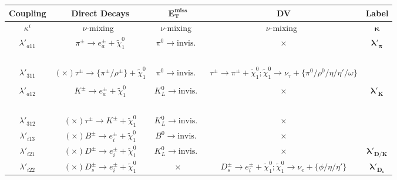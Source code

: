 \begin{table}[!ht]
\centering
\begin{adjustbox}{width=\columnwidth}
\begin{tabular}{|c|c|c|c|c|}
\hline
\bf{Coupling} & \bf{Direct Decays} & $\bm{E_T^\text{miss}}$ & \bf{DV} & \bf{Label}\\
\hline
$\kappa^i$ & $\nu$-mixing~\cite{Fernandez-Martinez:2023phj} & $\nu$-mixing~\cite{Fernandez-Martinez:2023phj} & $\nu$-mixing~\cite{Fernandez-Martinez:2023phj} & $\bm{\kappa}$\\
\hline
$\lambda'_{a11}$ & $\pi^\pm\to e^\pm_a + \tilde{\chi}^0_1$
& $\pi^0\to \text{invis.}$~\cite{NA62:2020pwi} & $\bm{\times}$ & \multirow{4}{*}{$\bm{\lambda'_{\pi}}$}\\[0.13 cm]
&~\cite{PiENu:2015seu, PIENU:2017wbj, PIENU:2019usb, PIONEER:2022alm} &&& \\[0.15 cm]
$\lambda'_{311}$ & $\left(\bm{\times}\right) \tau^\pm\to \{\pi^\pm/\rho^\pm\} + \tilde{\chi}^0_1$ & $\pi^0\to \text{invis.}$~\cite{NA62:2020pwi} & $\tau^\pm\to \pi^\pm + \tilde{\chi}^0_1; \tilde{\chi}^0_1 \to \nu_{\tau} + \{\pi^0/\rho^0/\eta/\eta'/\omega\}$
& \\[0.15 cm]
&&&\cite{Ballett:2019bgd, Kling:2018wct, DeVries:2020jbs, Beltran:2023nli}&\\
\hline
$\lambda'_{a12}$ & $K^\pm\to e^\pm_a + \tilde{\chi}^0_1$ & $K^0_L\to \text{invis.}$~\cite{Workman:2022ynf} & $\bm{\times}$ & \multirow{4}{*}{$\bm{\lambda'_{K}}$}\\[0.15 cm]
&~\cite{Asano:1981he, Hayano:1982wu, NA62:2020mcv, NA62:2021bji} &&&\\[0.15 cm]
$\lambda'_{312}$ & $\left(\bm{\times}\right) \tau^\pm\to K^\pm + \tilde{\chi}^0_1$ & $K^0_L\to \text{invis.}$~\cite{Workman:2022ynf} & $\bm{\times}$ & \\[0.15 cm]
\hline
$\lambda'_{i13}$ & $\left(\bm{\times}\right) B^\pm\to e^\pm_i + \tilde{\chi}^0_1$ & $B^0\to \text{invis.}$~\cite{BaBar:2012yut} & $\bm{\times}$ & $\bm{\lambda'_{B1}}$\\[0.15 cm]
\hline
$\lambda'_{i21}$ & $\left(\bm{\times}\right) D^\pm\to e^\pm_i + \tilde{\chi}^0_1$ & $K^0_L\to \text{invis.}$~\cite{Workman:2022ynf} & $\bm{\times}$ & $\bm{\lambda'_{D/K}}$\\[0.15 cm]
\hline
$\lambda'_{i22}$ & $\left(\bm{\times}\right) D_s^\pm\to e^\pm_i + \tilde{\chi}^0_1$ & $\bm{\times}$ & $D_s^\pm\to e^\pm_i + \tilde{\chi}^0_1; \tilde{\chi}^0_1\to \nu_e + \{\phi/\eta/\eta'\}$ 
& $\bm{\lambda'_{D_s}}$\\[0.15 cm]

\end{tabular}
\end{adjustbox}
\end{table}

